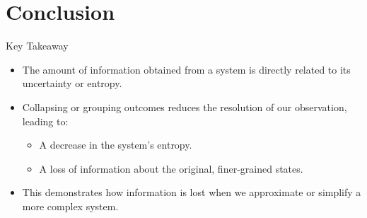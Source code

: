 \documentclass{beamer}
\begin{document}
\section{Conclusion}
\begin{frame}{Key Takeaway}
    \begin{itemize}
        \item The amount of information obtained from a system is directly related to its \alert{uncertainty} or \alert{entropy}.
        \item \alert{Collapsing or grouping outcomes} reduces the resolution of our observation, leading to:
            \begin{itemize}
                \item A decrease in the system's entropy.
                \item A \alert{loss of information} about the original, finer-grained states.
            \end{itemize}
        \item This demonstrates how information is lost when we approximate or simplify a more complex system.
    \end{itemize}
\end{frame}
\end{document}
